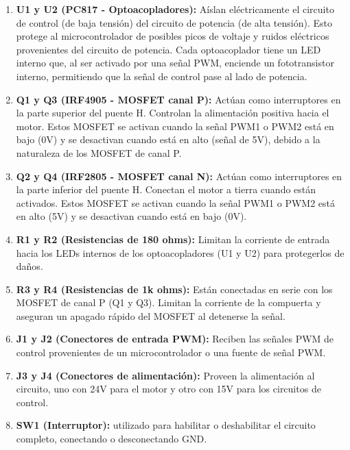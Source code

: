 \documentclass{article}
\begin{document}
\begin{enumerate}

    \item \textbf{U1 y U2 (PC817 - Optoacopladores):} Aíslan eléctricamente el circuito de control (de baja tensión) del circuito de potencia (de alta tensión). Esto protege al microcontrolador de posibles picos de voltaje y ruidos eléctricos provenientes del circuito de potencia.
    Cada optoacoplador tiene un LED interno que, al ser activado por una señal PWM, enciende un fototransistor interno, permitiendo que la señal de control pase al lado de potencia.
    
    \item \textbf{Q1 y Q3 (IRF4905 - MOSFET canal P):} Actúan como interruptores en la parte superior del puente H. Controlan la alimentación positiva hacia el motor. Estos MOSFET se activan cuando la señal PWM1 o PWM2 está en bajo (0V) y se desactivan cuando está en alto (señal de 5V), debido a la naturaleza de los MOSFET de canal P.
    
    \item \textbf{Q2 y Q4 (IRF2805 - MOSFET canal N):} Actúan como interruptores en la parte inferior del puente H. Conectan el motor a tierra cuando están activados. Estos MOSFET se activan cuando la señal PWM1 o PWM2 está en alto (5V) y se desactivan cuando está en bajo (0V).
    
    \item \textbf{R1 y R2 (Resistencias de 180 ohms):} Limitan la corriente de entrada hacia los LEDs internos de los optoacopladores (U1 y U2) para protegerlos de daños.
    
    \item \textbf{R3 y R4 (Resistencias de 1k ohms):} Están conectadas en serie con los MOSFET de canal P (Q1 y Q3). Limitan la corriente de la compuerta y aseguran un apagado rápido del MOSFET al detenerse la señal.
    
    \item \textbf{J1 y J2 (Conectores de entrada PWM):} Reciben las señales PWM de control provenientes de un microcontrolador o una fuente de señal PWM.
    
    \item \textbf{J3 y J4 (Conectores de alimentación):} Proveen la alimentación al circuito, uno con 24V para el motor y otro con 15V para los circuitos de control.
    
    \item \textbf{SW1 (Interruptor):}  utilizado para habilitar o deshabilitar el circuito completo, conectando o desconectando GND.

\end{enumerate}
\end{document}
